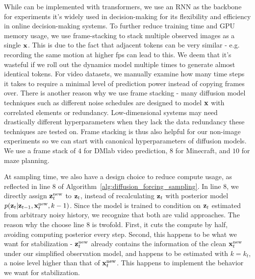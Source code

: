 While \algo{} can be implemented with transformers, we use an RNN as the backbone for \algo{} experiments it's widely used in decision-making for its flexibility and efficiency in online decision-making systems. To further reduce training time and GPU memory usage, we use frame-stacking to stack multiple observed images as a single $\mathbf{x}$. This is due to the fact that adjacent tokens can be very similar - e.g. recording the same motion at higher fps can lead to this. We deem that it's wasteful if we roll out the dynamics model multiple times to generate almost identical tokens. For video datasets, we manually examine how many time steps it takes to require a minimal level of prediction power instead of copying frames over. There is another reason why we use frame stacking - many diffusion model techniques such as different noise schedules are designed to model $\mathbf{x}$ with correlated elements or redundancy. Low-dimensional systems may need drastically different hyperparameters when they lack the data redundancy these techniques are tested on. Frame stacking is thus also helpful for our non-image experiments so we can start with canonical hyperparameters of diffusion models. We use a frame stack of $4$ for DMlab video prediction, $8$ for Minecraft, and $10$ for maze planning.

At sampling time, we also have a design choice to reduce compute usage, as reflected in line 8 of Algorithm~\ref{alg:diffusion_forcing_sampling}. In line 8, we directly assign $\mathbf{z}_t^{\text{new}}$ to $\mathbf{z}_t$, instead of recalculating $\mathbf{z}_t$ with posterior model $p(\mathbf{z}_t|\mathbf{z}_{t-1}, \mathbf{x}_t^{\text{new}}, k-1)$. Since the model is trained to condition on $\mathbf{z}_t$ estimated from arbitrary noisy history, we recognize that both are valid approaches. The reason why the choose line $8$ is twofold. First, it cuts the compute by half, avoiding computing posterior every step. Second, this happens to be what we want for stabilization - $\mathbf{z}_t^{\text{new}}$ already contains the information of the clean $\mathbf{x}_t^{\text{new}}$ under our simplified observation model, and happens to be estimated with $k=k_t$, a noise level higher than that of $\mathbf{x}_t^{\text{new}}$. This happens to implement the behavior we want for stabilization.









